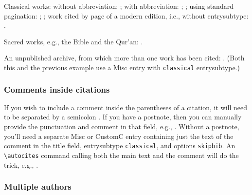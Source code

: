 \documentclass[a4paper,12pt]{report}
\newcommand{\cmd}[1]{\texttt{\textbackslash #1}}
\begin{document}
\enlargethispage{-\baselineskip}

Classical works: without abbreviation:
\autocite{aristotle:metaphy:trans}; with abbreviation:
\autocite{aristotle:metaphy:gr}; \autocite{plato:republic:gr}; using
standard pagination: \autocite*[3.2.996b5--8]{aristotle:metaphy:gr};
\autocite*[420e]{plato:republic:gr}; work cited by page of a modern
edition, i.e., without \textsf{entrysubtype}:
\autocite[198]{euripides:orestes}.

Sacred works, e.g., the Bible and the Qur'an:
\autocite[25:19--36:43]{genesis}.

An unpublished archive, from which more than one work has been cited:
\autocite[file 12]{house:papers}.  (Both this and the previous example
use a Misc entry with \texttt{classical} \textsf{entrysubtype}.)

\subsubsection*{Comments inside citations}
\label{sec:comments}

If you wish to include a comment inside the parentheses of a citation,
it will need to be separated by a semicolon
\autocite[15.23]{chicago:manual}.  If you have a \textsf{postnote},
then you can manually provide the punctuation and comment in that
field, e.g., \autocite[4; the unrevised trans.]{stendhal:parma}.
Without a \textsf{postnote}, you'll need a separate \textsf{Misc} or
\textsf{CustomC} entry containing just the text of the comment in the
\textsf{title} field, \textsf{entrysubtype} \texttt{classical}, and
\textsf{options} \texttt{skipbib}.  An \cmd{autocites} command calling
both the main text and the comment will do the trick, e.g.,
\autocites{chicago:manual}{chicago:comment}.

\subsubsection*{Multiple authors}
\label{sec:multiple}
\end{document}
